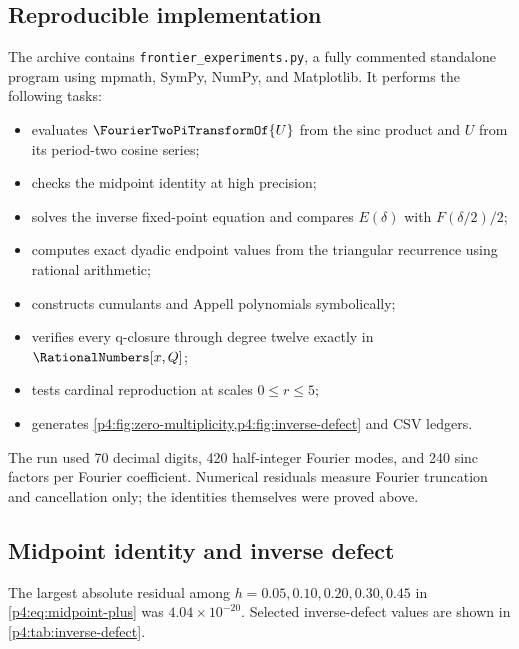 \documentclass[11pt]{article}
\numberwithin{equation}{section}
\theoremstyle{definition}
\theoremstyle{remark}
\begin{document}
\subsection{Reproducible implementation}
The archive contains \texttt{frontier\_experiments.py}, a fully commented standalone program using mpmath, SymPy, NumPy, and Matplotlib.  It performs the following tasks:
\begin{itemize}
\item evaluates $\FourierTwoPiTransformOf{U}$ from the sinc product and $U$ from its period-two cosine series;
\item checks the midpoint identity at high precision;
\item solves the inverse fixed-point equation and compares $E(\delta)$ with $F(\delta/2)/2$;
\item computes exact dyadic endpoint values from the triangular recurrence using rational arithmetic;
\item constructs cumulants and Appell polynomials symbolically;
\item verifies every q-closure through degree twelve exactly in $\RationalNumbers[x,Q]$;
\item tests cardinal reproduction at scales $0\le r\le5$;
\item generates \cref{p4:fig:zero-multiplicity,p4:fig:inverse-defect} and CSV ledgers.
\end{itemize}
The run used 70 decimal digits, 420 half-integer Fourier modes, and 240 sinc factors per Fourier coefficient.  Numerical residuals measure Fourier truncation and cancellation only; the identities themselves were proved above.

\subsection{Midpoint identity and inverse defect}
The largest absolute residual among
$h=0.05,0.10,0.20,0.30,0.45$ in \eqref{p4:eq:midpoint-plus} was
$4.04\times10^{-20}$.  Selected inverse-defect values are shown in \cref{p4:tab:inverse-defect}.
\end{document}
